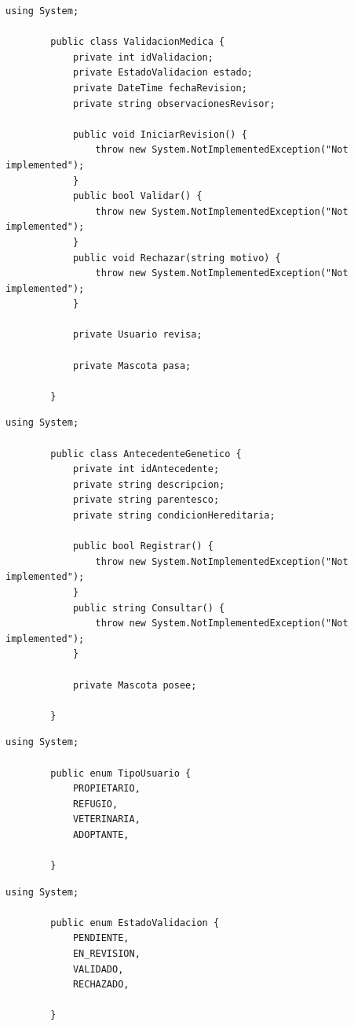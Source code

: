\documentclass[journal,onecolumn]{IEEEtran}
\begin{document}
	\begin{lstlisting}[caption={Clase \texttt{ValidacionMedica}.}, label={lst:validacionmedica}]
		using System;
		
		public class ValidacionMedica {
			private int idValidacion;
			private EstadoValidacion estado;
			private DateTime fechaRevision;
			private string observacionesRevisor;
			
			public void IniciarRevision() {
				throw new System.NotImplementedException("Not implemented");
			}
			public bool Validar() {
				throw new System.NotImplementedException("Not implemented");
			}
			public void Rechazar(string motivo) {
				throw new System.NotImplementedException("Not implemented");
			}
			
			private Usuario revisa;
			
			private Mascota pasa;
			
		}
	\end{lstlisting}
	
	\begin{lstlisting}[caption={Clase \texttt{AntecedenteGenetico}.}, label={lst:antecedentegenetico}]
		using System;
		
		public class AntecedenteGenetico {
			private int idAntecedente;
			private string descripcion;
			private string parentesco;
			private string condicionHereditaria;
			
			public bool Registrar() {
				throw new System.NotImplementedException("Not implemented");
			}
			public string Consultar() {
				throw new System.NotImplementedException("Not implemented");
			}
			
			private Mascota posee;
			
		}
	\end{lstlisting}
	
	\newpage
	
	\begin{lstlisting}[caption={Clase \texttt{TipoUsuario}.}, label={lst:tipousuario}]
		using System;
		
		public enum TipoUsuario {
			PROPIETARIO,
			REFUGIO,
			VETERINARIA,
			ADOPTANTE,
			
		}
	\end{lstlisting}
	
	\begin{lstlisting}[caption={Clase \texttt{EstadoValidacion}.}, label={lst:estadovalidacion}]
		using System;
		
		public enum EstadoValidacion {
			PENDIENTE,
			EN_REVISION,
			VALIDADO,
			RECHAZADO,
			
		}
	\end{lstlisting}
	
\end{document}
